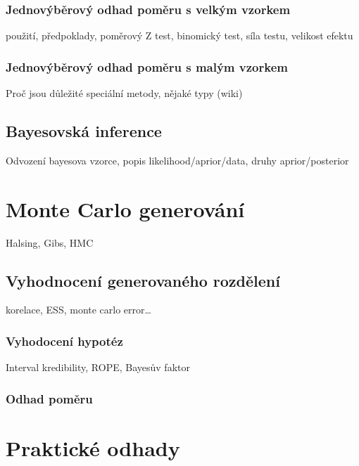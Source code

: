 \documentclass[
  11pt,
  a4paper]{report}
\begin{document}
\subsection{Jednovýběrový odhad poměru s velkým
vzorkem}\label{jednovuxfdbux11brovuxfd-odhad-pomux11bru-s-velkuxfdm-vzorkem}

použití, předpoklady, poměrový Z test, binomický test, síla testu,
velikost efektu

\subsection{Jednovýběrový odhad poměru s malým
vzorkem}\label{jednovuxfdbux11brovuxfd-odhad-pomux11bru-s-maluxfdm-vzorkem}

Proč jsou důležité speciální metody, nějaké typy (wiki)

\section{Bayesovská inference}\label{bayesovskuxe1-inference}

Odvození bayesova vzorce, popis likelihood/aprior/data, druhy
aprior/posterior

\chapter{Monte Carlo generování}\label{monte-carlo-generovuxe1nuxed}

Halsing, Gibs, HMC

\section{Vyhodnocení generovaného
rozdělení}\label{vyhodnocenuxed-generovanuxe9ho-rozdux11blenuxed}

korelace, ESS, monte carlo error\ldots{}

\subsection{Vyhodocení hypotéz}\label{vyhodocenuxed-hypotuxe9z}

Interval kredibility, ROPE, Bayesův faktor

\subsection{Odhad poměru}\label{odhad-pomux11bru}

\chapter{Praktické odhady}\label{praktickuxe9-odhady}
\end{document}
